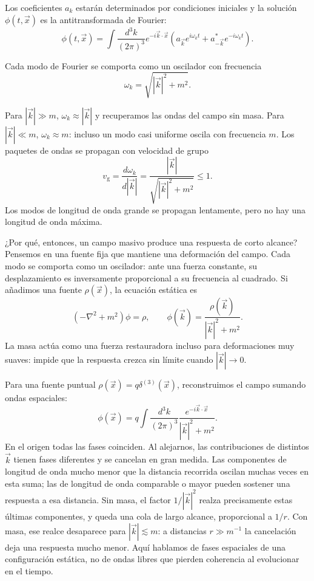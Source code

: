 \documentclass[11pt,a4paper]{article}
\begin{document}
Los coeficientes $a_k$ estarán determinados por condiciones iniciales y la solución $\phi(t,\vec x)$ es la antitransformada de Fourier:
\[
  \phi(t,\vec x)
  =\int\frac{d^3k}{(2\pi)^3}e^{-i\vec k\cdot\vec x}
    \left(a_{\vec k}e^{i\omega_k t}+a_{-\vec k}^*e^{-i\omega_k t}\right).
\]

Cada modo de Fourier se comporta como un oscilador con frecuencia
\[
  \omega_k=\sqrt{|\vec k|^2+m^2}.
\]

Para $|\vec k|\gg m$, $\omega_k\approx|\vec k|$ y recuperamos las
ondas del campo sin masa. Para $|\vec k|\ll m$, $\omega_k\approx m$:
incluso un modo casi uniforme oscila con frecuencia $m$. Los paquetes
de ondas se propagan con velocidad de grupo
\[
  v_{\mathrm g}=\frac{d\omega_k}{d|\vec k|}
  =\frac{|\vec k|}{\sqrt{|\vec k|^2+m^2}}\leq1.
\]
Los modos de longitud de onda grande se propagan lentamente, pero no
hay una longitud de onda máxima.

¿Por qué, entonces, un campo masivo produce una respuesta de corto alcance?
Pensemos en una fuente fija que mantiene una deformación del campo.
Cada modo se comporta como un oscilador: ante una fuerza constante, su
desplazamiento es inversamente proporcional a su frecuencia al cuadrado.
Si añadimos una fuente $\rho(\vec x)$, la ecuación estática es
\[
  (-\nabla^2+m^2)\phi=\rho,
  \qquad
  \phi(\vec k)=\frac{\rho(\vec k)}{|\vec k|^2+m^2}.
\]
La masa actúa como una fuerza restauradora incluso para deformaciones
muy suaves: impide que la respuesta crezca sin límite cuando
$|\vec k|\to0$.

Para una fuente puntual $\rho(\vec x)=q\delta^{(3)}(\vec x)$,
reconstruimos el campo sumando ondas espaciales:
\[
  \phi(\vec x)=q\int\frac{d^3k}{(2\pi)^3}
    \frac{e^{-i\vec k\cdot\vec x}}{|\vec k|^2+m^2}.
\]
En el origen todas las fases coinciden. Al alejarnos, las contribuciones
de distintos $\vec k$ tienen fases diferentes y se cancelan en gran
medida. Las componentes de longitud de onda mucho menor que la distancia
recorrida oscilan muchas veces en esta suma; las de longitud de onda
comparable o mayor pueden sostener una respuesta a esa distancia.
Sin masa, el factor $1/|\vec k|^2$ realza precisamente estas últimas
componentes, y queda una cola de largo alcance, proporcional a $1/r$.
Con masa, ese realce desaparece para $|\vec k|\lesssim m$: a distancias
$r\gg m^{-1}$ la cancelación deja una respuesta mucho menor.
Aquí hablamos de fases espaciales de una configuración estática, no de
ondas libres que pierden coherencia al evolucionar en el tiempo.
\end{document}
